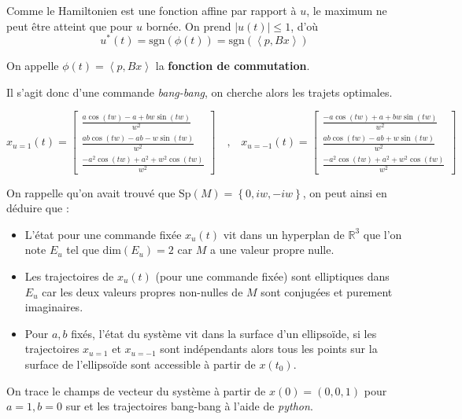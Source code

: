 \documentclass[
  french,
]{article}
\providecommand{\tightlist}{%
  \setlength{\itemsep}{0pt}\setlength{\parskip}{0pt}}
\begin{document}
Comme le Hamiltonien est une fonction affine par rapport à \(u\),
le maximum ne peut être atteint que pour \(u\) bornée.
On prend \(\left\lvert u(t)\right\rvert\leq 1\), d'où
\[ u^*(t) = \mathrm{sgn}(\phi(t)) = \mathrm{sgn}(\left\langle p{,}Bx\right\rangle)\]

On appelle \(\phi(t)=\left\langle p{,}Bx\right\rangle\) la \textbf{fonction de commutation}.

Il s'agit donc d'une commande \emph{bang-bang}, on cherche alors
les trajets optimales.

\[ x_{u=1}(t) = \left[\begin{matrix}\frac{a \cos{\left(t w \right)} - a + b w \sin{\left(t w \right)}}{w^{2}}\\\frac{a b \cos{\left(t w \right)} - a b - w \sin{\left(t w \right)}}{w^{2}}\\\frac{- a^{2} \cos{\left(t w \right)} + a^{2} + w^{2} \cos{\left(t w \right)}}{w^{2}}\end{matrix}\right] \quad\text{,}\quad x_{u=-1}(t) = \left[\begin{matrix}\frac{- a \cos{\left(t w \right)} + a + b w \sin{\left(t w \right)}}{w^{2}}\\\frac{a b \cos{\left(t w \right)} - a b + w \sin{\left(t w \right)}}{w^{2}}\\\frac{- a^{2} \cos{\left(t w \right)} + a^{2} + w^{2} \cos{\left(t w \right)}}{w^{2}}\end{matrix}\right]\]

On rappelle qu'on avait trouvé que \(\mathrm{Sp}(M) = \left\{0, iw, -iw\right\}\),
on peut ainsi en déduire que :

\begin{itemize}
\tightlist
\item
  L'état pour une commande fixée \(x_u(t)\) vit dans un hyperplan de \(\mathbb{R}^3\)
  que l'on note \(E_u\) tel que \(\mathrm{dim}(E_u)=2\) car \(M\) a une valeur propre nulle.
\item
  Les trajectoires de \(x_u(t)\) (pour une commande fixée) sont elliptiques
  dans \(E_u\) car les deux valeurs propres non-nulles de \(M\) sont conjugées
  et purement imaginaires.
\item
  Pour \(a,b\) fixés, l'état du système vit dans la surface d'un ellipsoïde,
  si les trajectoires \(x_{u=1}\) et \(x_{u=-1}\) sont indépendants
  alors tous les points sur la surface de l'ellipsoïde sont accessible à partir de \(x(t_0)\).
\end{itemize}

On trace le champs de vecteur du système
à partir de \(x(0)=(0, 0, 1)\) pour \(a=1,b=0\)
sur et les trajectoires bang-bang
à l'aide de \emph{python}.
\end{document}
